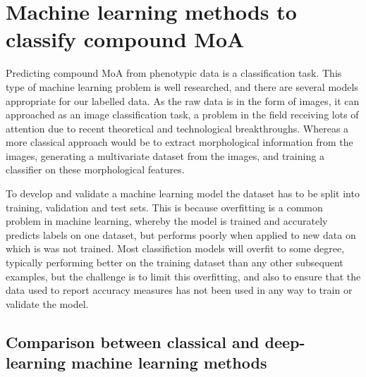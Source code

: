 \documentclass[a4paper,11pt,twoside,openright]{scrbook}
\begin{document}
\section{Machine learning methods to classify compound MoA}
Predicting compound MoA from phenotypic data is a classification task.
This type of machine learning problem is well researched, and there are several models appropriate for our labelled data.
As the raw data is in the form of images, it can approached as an image classification task, a problem in the field receiving lots of attention due to recent theoretical and technological breakthroughs. %
Whereas a more classical approach would be to extract morphological information from the images, generating a multivariate dataset from the images, and training a classifier on these morphological features.

To develop and validate a machine learning model the dataset has to be split into training, validation and test sets.
This is because overfitting is a common problem in machine learning, whereby the model is trained and accurately predicts labels on one dataset, but performs poorly when applied to new data on which is was not trained.
Most classifiction models will overfit to some degree, typically performing better on the training dataset than any other subsequent examples, but the challenge is to limit this overfitting, and also to ensure that the data used to report accuracy measures has not been used in any way to train or validate the model.



\subsection{Comparison between classical and deep-learning machine learning methods}
\end{document}

